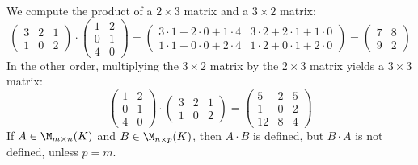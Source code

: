 \begin{example}
We compute the product of a $2 \times 3$ matrix and a $3 \times 2$ matrix:
\begin{equation*}
    \begin{pmatrix} 3 & 2 & 1 \\ 1 & 0 & 2 \end{pmatrix} \cdot \begin{pmatrix} 1 & 2 \\ 0 & 1 \\ 4 & 0 \end{pmatrix} = \begin{pmatrix} 3 \cdot 1 + 2 \cdot 0 + 1 \cdot 4 & 3 \cdot 2 + 2 \cdot 1 + 1 \cdot 0 \\ 1 \cdot 1 + 0 \cdot 0 + 2 \cdot 4 & 1 \cdot 2 + 0 \cdot 1 + 2 \cdot 0 \end{pmatrix} = \begin{pmatrix} 7 & 8 \\ 9 & 2 \end{pmatrix}
\end{equation*}
In the other order, multiplying the $3 \times 2$ matrix by the $2 \times 3$ matrix yields a $3 \times 3$ matrix:
\begin{equation*}
    \begin{pmatrix} 1 & 2 \\ 0 & 1 \\ 4 & 0 \end{pmatrix} \cdot \begin{pmatrix} 3 & 2 & 1 \\ 1 & 0 & 2 \end{pmatrix} = \begin{pmatrix} 5 & 2 & 5 \\ 1 & 0 & 2 \\ 12 & 8 & 4 \end{pmatrix}
\end{equation*}
If $A \in \M_{m \times n}(K)$ and $B \in \M_{n \times p}(K)$, then $A \cdot B$ is defined, but $B \cdot A$ is not defined, unless $p = m$.
\end{example}

